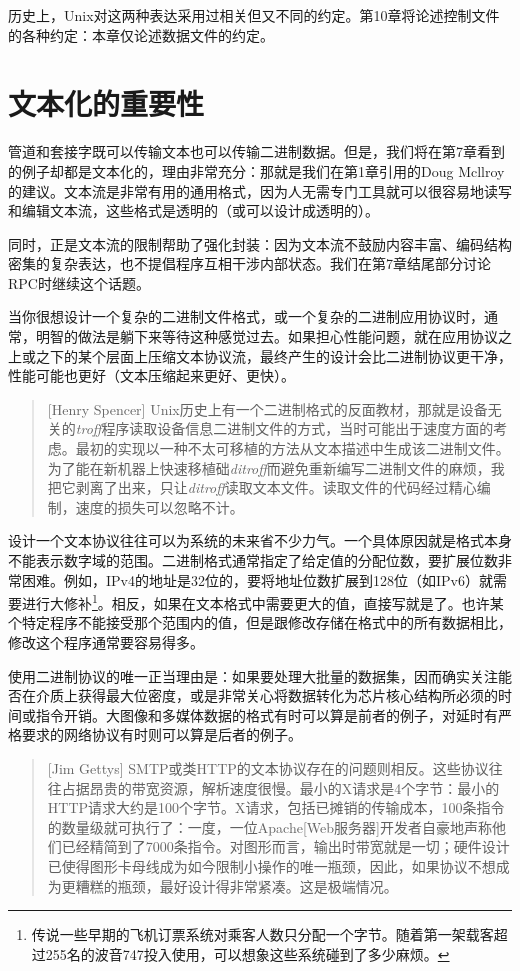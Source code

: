 \documentclass[11pt,oneside]{book}
\begin{document}
\begin{common-format}
历史上，Unix对这两种表达采用过相关但又不同的约定。第10章将论述控制文件的各种约定：本章仅论述数据文件的约定。

\section{文本化的重要性}
管道和套接字既可以传输文本也可以传输二进制数据。但是，我们将在第7章看到的例子却都是文本化的，理由非常充分：那就是我们在第1章引用的Doug Mcllroy的建议。文本流是非常有用的通用格式，因为人无需专门工具就可以很容易地读写和编辑文本流，这些格式是透明的（或可以设计成透明的）。

同时，正是文本流的限制帮助了强化封装：因为文本流不鼓励内容丰富、编码结构密集的复杂表达，也不提倡程序互相干涉内部状态。我们在第7章结尾部分讨论RPC时继续这个话题。

当你很想设计一个复杂的二进制文件格式，或一个复杂的二进制应用协议时，通常，明智的做法是躺下来等待这种感觉过去。如果担心性能问题，就在应用协议之上或之下的某个层面上压缩文本协议流，最终产生的设计会比二进制协议更干净，性能可能也更好（文本压缩起来更好、更快）。

\begin{quote}[Henry Spencer]
Unix历史上有一个二进制格式的反面教材，那就是设备无关的\textit{troff}程序读取设备信息二进制文件的方式，当时可能出于速度方面的考虑。最初的实现以一种不太可移植的方法从文本描述中生成该二进制文件。为了能在新机器上快速移植础\textit{ditroff}而避免重新编写二进制文件的麻烦，我把它剥离了出来，只让\textit{ditroff}读取文本文件。读取文件的代码经过精心编制，速度的损失可以忽略不计。
\end{quote}

设计一个文本协议往往可以为系统的未来省不少力气。一个具体原因就是格式本身不能表示数字域的范围。二进制格式通常指定了给定值的分配位数，要扩展位数非常困难。例如，IPv4的地址是32位的，要将地址位数扩展到128位（如IPv6）就需要进行大修补\footnote{传说一些早期的飞机订票系统对乘客人数只分配一个字节。随着第一架载客超过255名的波音747投入使用，可以想象这些系统碰到了多少麻烦。}。相反，如果在文本格式中需要更大的值，直接写就是了。也许某个特定程序不能接受那个范围内的值，但是跟修改存储在格式中的所有数据相比，修改这个程序通常要容易得多。

使用二进制协议的唯一正当理由是：如果要处理大批量的数据集，因而确实关注能否在介质上获得最大位密度，或是非常关心将数据转化为芯片核心结构所必须的时间或指令开销。大图像和多媒体数据的格式有时可以算是前者的例子，对延时有严格要求的网络协议有时则可以算是后者的例子。

\begin{quote}[Jim Gettys]
SMTP或类HTTP的文本协议存在的问题则相反。这些协议往往占据昂贵的带宽资源，解析速度很慢。最小的X请求是4个字节：最小的HTTP请求大约是100个字节。X请求，包括已摊销的传输成本，100条指令的数量级就可执行了：一度，一位Apache[Web服务器]开发者自豪地声称他们已经精简到了7000条指令。对图形而言，输出时带宽就是一切；硬件设计已使得图形卡母线成为如今限制小操作的唯一瓶颈，因此，如果协议不想成为更糟糕的瓶颈，最好设计得非常紧凑。这是极端情况。
\end{quote}


\end{common-format}
\end{document}
